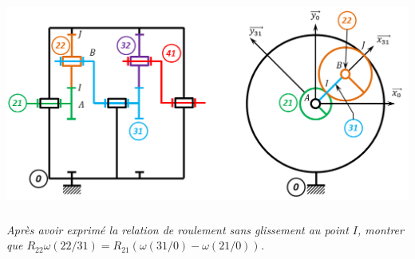 \documentclass[11pt,oneside]{article}
\begin{document}
\begin{center}
\includegraphics[width=.95\textwidth]{png/A6_train}
\end{center}

\subparagraph{}
\textit{Après avoir exprimé la relation de roulement sans glissement au point $I$, montrer que $R_{22} \omega(22/31) = R_{21} \left( \omega(31/0) - \omega(21/0)\right)$. }
\end{document}

